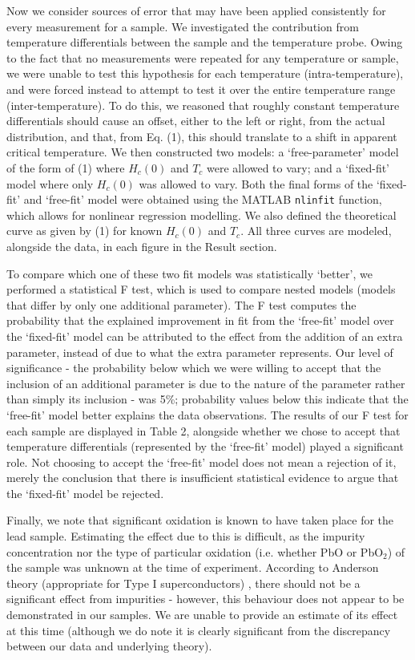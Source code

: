 \documentclass[aps,prl,nofootinbib,twocolumn,superscriptaddress,groupedaddress]{revtex4}  %
\begin{document}
Now we consider sources of error that may have been applied consistently for every measurement for a sample. We investigated the contribution from temperature differentials between the sample and the temperature probe. Owing to the fact that no measurements were repeated for any temperature or sample, we were unable to test this hypothesis for each temperature (intra-temperature), and were forced instead to attempt to test it over the entire temperature range (inter-temperature). To do this, we reasoned that roughly constant temperature differentials should cause an offset, either to the left or right, from the actual distribution, and that, from Eq. (1), this should translate to a shift in apparent critical temperature. We then constructed two models: a `free-parameter' model of the form of (1) where $H_{c}(0)$ and $T_{c}$ were allowed to vary; and a `fixed-fit' model where only $H_{c}(0)$ was allowed to vary. Both the final forms of the `fixed-fit' and `free-fit' model were obtained using the MATLAB \texttt{nlinfit} function, which allows for nonlinear regression modelling. We also defined the theoretical curve as given by (1) for known $H_{c}(0)$ and $T_{c}$.  All three curves are modeled, alongside the data, in each figure in the Result section.

To compare which one of these two fit models was statistically `better', we performed a statistical F test, which is used to compare nested models (models that differ by only one additional parameter)\cite{ftest}. The F test computes the probability that the explained improvement in fit from the `free-fit' model over the `fixed-fit' model can be attributed to the effect from the addition of an extra parameter, instead of due to what the extra parameter represents. Our level of significance - the probability below which we were willing to accept that the inclusion of an additional parameter is due to the nature of the parameter rather than simply its inclusion - was 5\%; probability values below this indicate that the `free-fit' model better explains the data observations. The results of our F test for each sample are displayed in Table 2, alongside whether we chose to accept that temperature differentials (represented by the `free-fit' model) played a significant role. Not choosing to accept the `free-fit' model does not mean a rejection of it, merely the conclusion that there is insufficient statistical evidence to argue that the `fixed-fit' model be rejected\cite{ftest}.

Finally, we note that significant oxidation is known to have taken place for the lead sample. Estimating the effect due to this is difficult, as the impurity concentration nor the type of particular oxidation (i.e. whether PbO or PbO$_{2}$) of the sample was unknown at the time of experiment. According to Anderson theory (appropriate for Type I superconductors) \cite{impuresuper}, there should not be a significant effect from impurities - however, this behaviour does not appear to be demonstrated in our samples. We are unable to provide an estimate of its effect at this time (although we do note it is clearly significant from the discrepancy between our data and underlying theory).
\end{document}
